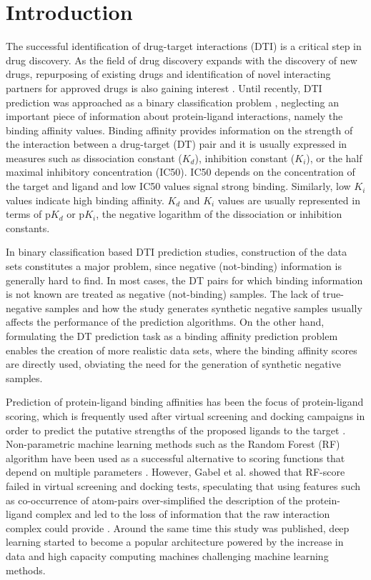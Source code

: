 \documentclass[11pt,letterpaper]{article}
\begin{document}
\section*{Introduction}

The successful identification of drug-target interactions (DTI) is a critical step in drug discovery. As the field of drug discovery expands with the discovery of new drugs, repurposing of existing drugs and identification of novel interacting partners for approved drugs is also gaining interest \cite{oprea2012drug}. Until recently, DTI prediction was approached as a binary classification problem \cite{yamanishi2008predict, bleakley2009, laarhoven2011, gonen2012predict, cao2014computational, cao2012large, cobanoglu2013predict, ozturk2016comparative}, neglecting an important piece of information about protein-ligand interactions, namely the binding affinity values. Binding affinity provides information on the strength of the interaction between a drug-target (DT) pair and it is usually expressed in measures such as dissociation constant ($K_d$), inhibition constant ($K_i$), or the half maximal inhibitory concentration (IC50). IC50 depends on the concentration of the target and ligand \cite{cer2009ic} and low IC50 values signal strong binding. 
Similarly, low $K_i$ values indicate high binding affinity. $K_d$ and $K_i$ values are usually represented in terms of p$K_d$ or p$K_i$, the negative logarithm of the dissociation or inhibition constants. 

In binary classification based DTI prediction studies, construction of the data sets constitutes a major problem, since negative (not-binding) information is generally hard to find. In most cases, the DT pairs for which binding information is not known are treated as negative (not-binding) samples.  The lack of true-negative samples and how the study generates synthetic negative samples usually affects the performance of the prediction algorithms. On the other hand, formulating the DT prediction task as a binding affinity prediction problem enables the creation of more realistic data sets, where the binding affinity scores are directly used, obviating the need for the generation of synthetic negative samples. 

Prediction of protein-ligand  binding affinities has been the focus of protein-ligand scoring, which is frequently used after virtual screening and docking campaigns in order to predict the putative strengths of the proposed ligands to the target \cite{ragoza2017protein}. Non-parametric machine learning methods such as the Random Forest (RF) algorithm have been used as a successful alternative to scoring functions that depend on multiple parameters  \cite{ballester2010machine,li2015low,shar2016pred}. However, Gabel et al. showed that RF-score failed in virtual screening and docking tests, speculating that using features such as co-occurrence of atom-pairs over-simplified the description of the protein-ligand complex and led to the loss of information that the raw interaction complex could provide \cite{gabel2014beware}. Around the same time this study was published, deep learning started to become a popular architecture powered by the increase in data and high capacity computing machines challenging machine learning methods. 
\end{document}
